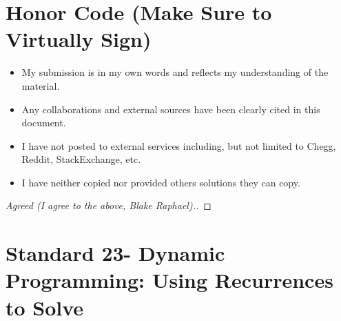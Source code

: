 \documentclass[11pt]{article}
\theoremstyle{definition}
\theoremstyle{definition}
\theoremstyle{definition}
\begin{document}
\section{Honor Code (Make Sure to Virtually Sign)} \label{HonorCode}

\begin{itemize}
\item My submission is in my own words and reflects my understanding of the material.
\item Any collaborations and external sources have been clearly cited in this document.
\item I have not posted to external services including, but not limited to Chegg, Reddit, StackExchange, etc.
\item I have neither copied nor provided others solutions they can copy.
\end{itemize}


\begin{proof}[Agreed (I agree to the above, Blake Raphael).]
\end{proof}
\newpage
\section{Standard 23- Dynamic Programming: Using Recurrences to Solve}
\end{document}
